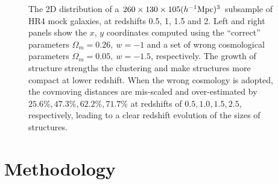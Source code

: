 \documentclass[iop]{emulateapj}
\begin{document}

\begin{figure}
   \caption{\label{fig_scatter}
  The 2D distribution of a $260\times130\times105 (h^{-1}{\rm Mpc})^3$ subsample of HR4 mock galaxies, 
  at redshifts 0.5, 1, 1.5 and 2.
  Left and right panels show the $x$, $y$ coordinates computed using the ``correct'' parameters $\Omega_m=0.26,\ w=-1$ 
  and a set of wrong cosmological parameters $\Omega_m=0.05,\ w=-1.5$, respectively.
  The growth of structure strengths the clustering and make structures more compact at lower redshift.
  When the wrong cosmology is adopted, the covmoving distances are mis-scaled and over-estimated by $25.6\%,47.3\%,62.2\%,71.7\%$ at redshifts of $0.5,1.0,1.5,2.5$, respectively,  leading to a clear redshift evolution of the sizes of structures.
   }
\end{figure}

\section{Methodology}
\end{document}
